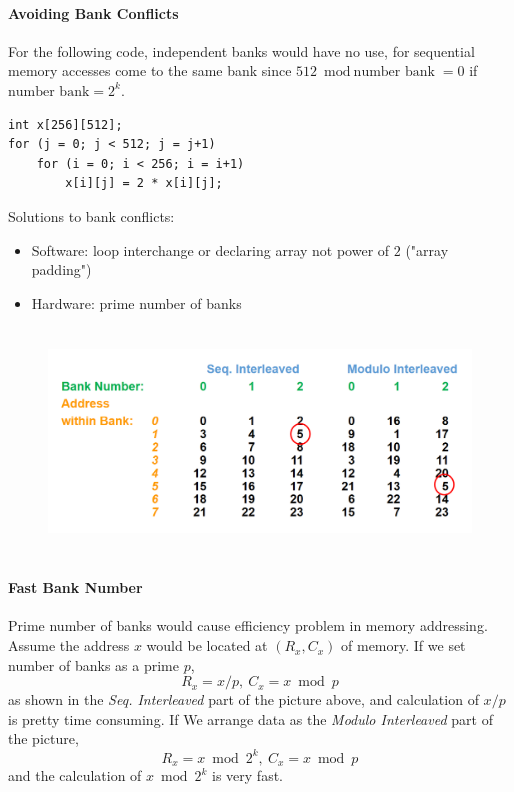 \documentclass[12pt, a4paper]{article}
\theoremstyle{margin}
\begin{document}
				\paragraph{Avoiding Bank Conflicts} For the following code, independent banks would have no use, for sequential memory accesses come to the same bank since $512\bmod\text{number bank}=0$ if $\text{number bank}=2^k$.
\begin{lstlisting}
int x[256][512];
for (j = 0; j < 512; j = j+1)
    for (i = 0; i < 256; i = i+1)
        x[i][j] = 2 * x[i][j];
\end{lstlisting}
				Solutions to bank conflicts:
				\begin{itemize}
					\item Software: loop interchange or declaring array not power of $2$ ("array padding")
					\item Hardware: prime number of banks
				\end{itemize}
				\begin{figure}[H]
					\begin{center}
					  \includegraphics[height=6cm]{address-within-bank.png}
					\end{center}
			  \end{figure}
			  \paragraph{Fast Bank Number} Prime number of banks would cause efficiency problem in memory addressing. Assume the address $x$ would be located at $(R_x, C_x)$ of memory. If we set number of banks as a prime $p$,
			  \[R_x = x / p,\ C_x = x \bmod p\]
			  as shown in the \emph{Seq. Interleaved} part of the picture above, and calculation of $x / p$ is pretty time consuming.
				If We arrange data as the \emph{Modulo Interleaved} part of the picture,
				\[R_x = x \bmod 2^k,\ C_x = x \bmod p\]
				and the calculation of $x \bmod 2^k$ is very fast.
\end{document}
